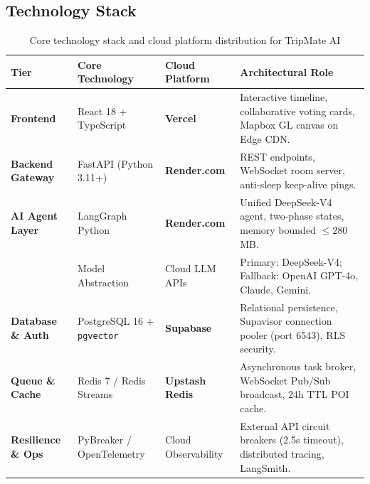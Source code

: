 \documentclass[11pt,a4paper]{article}
\begin{document}
\subsection{Technology Stack}
\begin{table}[H]
\centering
\footnotesize
\renewcommand{\arraystretch}{1.05}
\begin{tabularx}{\textwidth}{@{}l p{3.2cm} p{3.0cm} X@{}}
\toprule
\textbf{Tier} & \textbf{Core Technology} & \textbf{Cloud Platform} & \textbf{Architectural Role} \\
\midrule
\textbf{Frontend} & React 18 + TypeScript & \textbf{Vercel} & Interactive timeline, collaborative voting cards, Mapbox GL canvas on Edge CDN. \\
\midrule
\textbf{Backend Gateway} & FastAPI (Python 3.11+) & \textbf{Render.com} & REST endpoints, WebSocket room server, anti-sleep keep-alive pings. \\
\midrule
\textbf{AI Agent Layer} & LangGraph Python & \textbf{Render.com} & Unified DeepSeek-V4 agent, two-phase states, memory bounded $\le 280$\,MB. \\
& Model Abstraction & Cloud LLM APIs & Primary: DeepSeek-V4; Fallback: OpenAI GPT-4o, Claude, Gemini. \\
\midrule
\textbf{Database \& Auth} & PostgreSQL 16 + \texttt{pgvector} & \textbf{Supabase} & Relational persistence, Supavisor connection pooler (port 6543), RLS security. \\
\midrule
\textbf{Queue \& Cache} & Redis 7 / Redis Streams & \textbf{Upstash Redis} & Asynchronous task broker, WebSocket Pub/Sub broadcast, 24h TTL POI cache. \\
\midrule
\textbf{Resilience \& Ops} & PyBreaker / OpenTelemetry & Cloud Observability & External API circuit breakers (2.5s timeout), distributed tracing, LangSmith. \\
\bottomrule
\end{tabularx}
\vspace{-0.2cm}
\caption{Core technology stack and cloud platform distribution for TripMate AI}
\label{tab:tech_stack}
\end{table}
\end{document}
